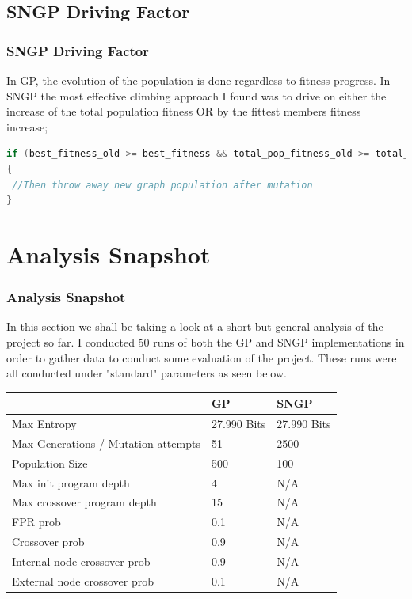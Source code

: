 \documentclass{beamer}
\begin{document}
\subsection{SNGP Driving Factor}
\begin{frame}[fragile]
\frametitle{SNGP Driving Factor}

In GP, the evolution of the population is done regardless to fitness progress. In SNGP the most effective climbing approach I found was to drive on either the increase of the total population fitness OR by the fittest members fitness increase;\newline

\begin{lstlisting}[language=C, basicstyle=\scriptsize]
if (best_fitness_old >= best_fitness && total_pop_fitness_old >= total_pop_fitness)
{
 //Then throw away new graph population after mutation
}
\end{lstlisting}
\end{frame}


\section{Analysis Snapshot}
\begin{frame}
\frametitle{Analysis Snapshot}
In this section we shall be taking a look at a short but general analysis of the project so far. I conducted 50 runs of both the GP and SNGP implementations in order to gather data to conduct some evaluation of the project. These runs were all conducted under "standard" parameters as seen below.

\begin{table}
    \begin{tabular}{l|l|l}
    ~                                   & GP          & SNGP        \\ \hline
    Max Entropy                         & 27.990 Bits & 27.990 Bits \\
    Max Generations / Mutation attempts & 51          & 2500        \\
    Population Size                     & 500         & 100         \\
    Max init program depth              & 4           & N/A         \\
    Max crossover program depth         & 15          & N/A         \\
    FPR prob                            & 0.1         & N/A         \\
    Crossover prob                      & 0.9         & N/A         \\
    Internal node crossover prob        & 0.9         & N/A         \\
    External node crossover prob        & 0.1         & N/A         \\
    \end{tabular}
\end{table}

\end{frame}
\end{document}
